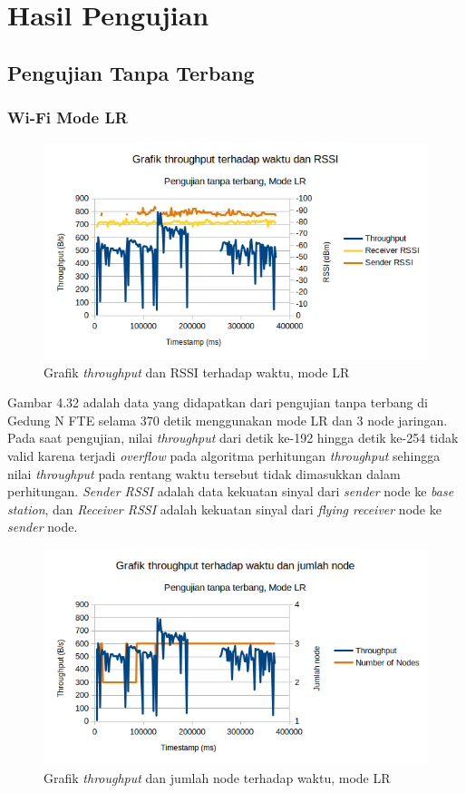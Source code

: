\section{Hasil Pengujian}
\subsection{Pengujian Tanpa Terbang}
\subsubsection{Wi-Fi Mode LR}
\begin{figure}[H]
	\centering
	\includegraphics[scale=0.7]{./assets/Graphs/NoFly_LR/Throughput-Time}
	\caption{Grafik \textit{throughput} dan RSSI terhadap waktu, mode LR}
\end{figure}
Gambar 4.32 adalah data yang didapatkan dari pengujian tanpa terbang di Gedung N FTE selama 370 detik menggunakan mode LR dan 3 node jaringan. Pada saat pengujian, nilai \textit{throughput} dari detik ke-192 hingga detik ke-254 tidak valid karena terjadi \textit{overflow} pada algoritma perhitungan \textit{throughput} sehingga nilai \textit{throughput} pada rentang waktu tersebut tidak dimasukkan dalam perhitungan. \textit{Sender RSSI} adalah data kekuatan sinyal dari \textit{sender} node ke \textit{base station}, dan \textit{Receiver RSSI} adalah kekuatan sinyal dari \textit{flying receiver} node ke \textit{sender} node.
\begin{figure}[H]
	\centering
	\includegraphics[scale=0.7]{./assets/Graphs/NoFly_LR/Throughput-Nodes}
	\caption{Grafik \textit{throughput} dan jumlah node terhadap waktu, mode LR}
\end{figure}
